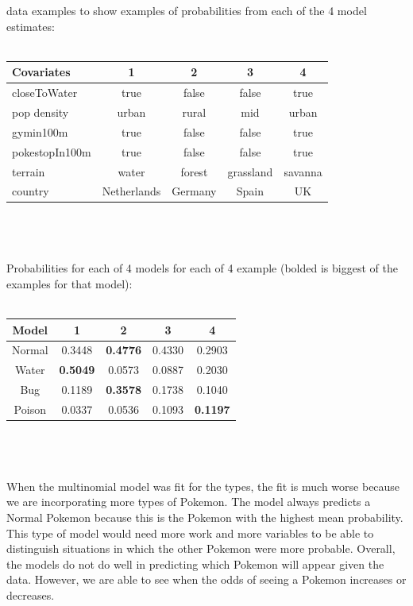 \documentclass{article}
\begin{document}
\newpage
{} data examples to show examples of probabilities from each of the 4 model estimates:  \\ 
\\ 
\begin{tabular}{| l | c | c | c | c |}
	\hline
	Covariates & 1 & 2 & 3 & 4 \\ 
	\hline
	closeToWater & true & false & false & true \\ 
	pop density & urban & rural & mid & urban \\ 
	gymin100m & true & false & false & true \\ 
	pokestopIn100m & true  & false & false & true \\ 
	terrain & water & forest & grassland & savanna \\ 
	country & Netherlands & Germany & Spain & UK \\ 
	\hline 
\end{tabular}
\\ 
\\ \\ 
Probabilities for each of 4 models for each of 4 example (bolded is biggest of the examples for that model): \\
\\  
\begin{tabular}{ | c | c | c | c | c |}
	\hline
	Model & 1 & 2 & 3 & 4\\ 
	\hline
	Normal & 0.3448 & \textbf{0.4776} & 0.4330 & 0.2903 \\
	Water & \textbf{0.5049} & 0.0573 & 0.0887 & 0.2030 \\ 
	Bug & 0.1189  & \textbf{0.3578} & 0.1738 & 0.1040 \\ 
	Poison & 0.0337 & 0.0536 & 0.1093 & \textbf{0.1197} \\ 	
	\hline
\end{tabular}\\ 
\\ \\
When the multinomial model was fit for the types, the fit is much worse because we are incorporating more types of Pokemon. The model always predicts a Normal Pokemon because this is the Pokemon with the highest mean probability. This type of model would need more work and more variables to be able to distinguish situations in which the other Pokemon were more probable. Overall, the models do not do well in predicting which Pokemon will appear given the data. However, we are able to see when the odds of seeing a Pokemon increases or decreases.
\end{document}
